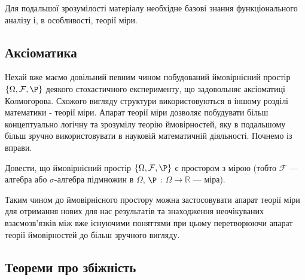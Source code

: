 
Для подальшої зрозумілості матеріалу необхідне базові знання функціонального аналізу і, 
в особливості, теорії міри. 

\subsection*{Аксіоматика}

Нехай вже маємо довільний певним чином побудований ймовірнісний простір 
$\{\Omega, \mathcal{F}, \P \}$ деякого стохастичного експерименту, що задовольняє 
аксіоматиці Колмогорова. Схожого вигляду структури використовуються в іншому розділі 
математики - теорії міри. Апарат теорії міри дозволяє побудувати більш концептуально 
логічну та зрозумілу теорію ймовірностей, яку в подальшому більш зручно використовувати в 
науковій математичній діяльності. Почнемо із вправи.
\begin{exercise}
    Довести, що ймовірнісний простір $\{\Omega, \mathcal{F}, \P \}$ є простором з 
    мірою (тобто $\mathcal{F}$ --- алгебра або $\sigma$-алгебра підмножин в 
    $\Omega$, $\P$ : $\Omega \rightarrow \mathbb{R}$ --- міра).
\end{exercise}
Таким чином до ймовірнісного простору можна застосовувати апарат теорії міри для 
отримання нових для нас результатів та знаходження неочікуваних 
взаємозв'язків між вже існуючими поняттями при цьому перетворюючи апарат теорії 
ймовірностей до більш зручного вигляду.

\subsection*{Теореми про збіжність}

